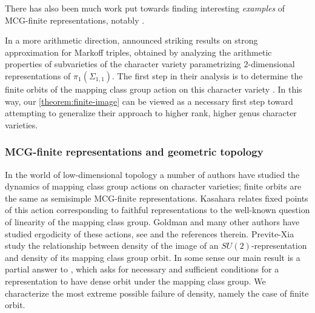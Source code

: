 There has also been much work put towards finding interesting \emph{examples} of MCG-finite representations, notably \cite{doran:isomonodromic,diarra2013construction,girand:a-new-two-parameter-family,diarra2015ramified,girand2016algebraic}.

In a more arithmetic direction, \cite{bourgainGS:announcement}
announced striking results on strong approximation for Markoff triples, obtained by analyzing the
arithmetic properties of subvarieties of the character variety parametrizing $2$-dimensional
representations of $\pi_1(\Sigma_{1,1})$.
The first step in their analysis is to determine the finite orbits of the
mapping class group action on this character variety \cite[last paragraph of p.
132]{bourgainGS:announcement}.
In this way, our \autoref{theorem:finite-image} can be viewed as a necessary
first step
toward attempting to generalize their approach to
higher rank, higher genus character
varieties.

\subsubsection{MCG-finite representations and geometric topology}

In the world of low-dimensional topology a number of authors have studied the
dynamics of mapping class group actions on character varieties; finite orbits
are the same as semisimple MCG-finite representations. Kasahara
\cite{kasahara2015visualization} relates fixed points of this action
corresponding to faithful representations to the well-known question of
linearity of the mapping class group. Goldman and many other authors have
studied ergodicity of these actions, see \cite{goldmanmapping} and the
references therein. Previte-Xia \cite{previte2000topological,previte2002topological} study the relationship between density of the image of
an $SU(2)$-representation and density of its mapping class group orbit. In some
sense our main result is a partial answer to \cite[Question
2.7]{goldmanmapping}, which asks for necessary and sufficient conditions for a
representation to have dense orbit under the mapping class group. We
characterize the most extreme possible failure of density, namely the case of
finite orbit.

